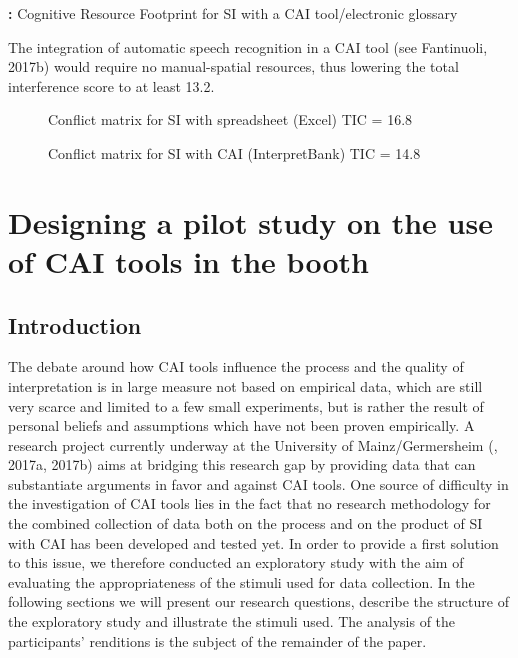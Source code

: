 \documentclass[output=paper]{langsci/langscibook}
\begin{document}
\begin{styleFramecontents}
\textbf{:} Cognitive Resource Footprint for SI with a CAI tool/electronic glossary
\end{styleFramecontents}

 

The integration of automatic speech recognition in a CAI tool (see Fantinuoli, 2017b) would require no manual-spatial resources, thus lowering the total interference score to at least 13.2.

\begin{styleFramecontents}\begin{figure}
\caption{Conflict matrix for SI with spreadsheet (Excel) TIC = 16.8}
\label{fig:key:7}
\end{figure}\end{styleFramecontents}

\begin{styleFramecontents}\begin{figure}
\caption{Conflict matrix for SI with CAI (InterpretBank) TIC = 14.8}
\label{fig:key:6}
\end{figure}\end{styleFramecontents}

 

 
\section{Designing a pilot study on the use of CAI tools in the booth}
\subsection{Introduction}

The debate around how CAI tools influence the process and the quality of interpretation is in large measure not based on empirical data, which are still very scarce and limited to a few small experiments, but is rather the result of personal beliefs and assumptions which have not been proven empirically. A research project currently underway at the University of Mainz/Germersheim (\citealt{Prandi2016}, 2017a, 2017b) aims at bridging this research gap by providing data that can substantiate arguments in favor and against CAI tools. One source of difficulty in the investigation of CAI tools lies in the fact that no research methodology for the combined collection of data both on the process and on the product of SI with CAI has been developed and tested yet. In order to provide a first solution to this issue, we therefore conducted an exploratory study with the aim of evaluating the appropriateness of the stimuli used for data collection. In the following sections we will present our research questions, describe the structure of the exploratory study and illustrate the stimuli used. The analysis of the participants’ renditions is the subject of the remainder of the paper.
\end{document}
